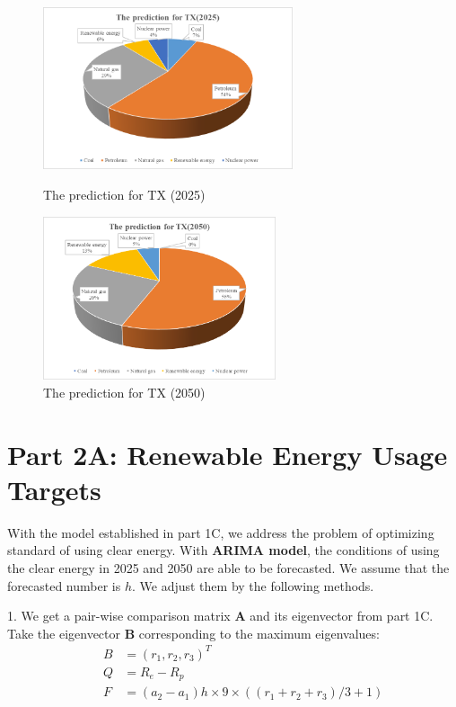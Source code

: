 \documentclass{mcmthesis}
\begin{document}
\begin{figure}
\begin{minipage}[t]{0.5\linewidth}
\centering
\includegraphics[width=2.9in]{./picturec/TXF2025.png}
\caption{The prediction for TX (2025)}
\label{fig:left:21}
\end{minipage}%
\begin{minipage}[t]{0.5\linewidth}
\centering
\includegraphics[width=2.7in]{./picturec/TXF2050.png}
\caption{The prediction for TX (2050)}
\label{fig:right:22}
\end{minipage}
\end{figure}     

\section{Part 2A: Renewable Energy Usage Targets}

With the model established in part 1C, we address the problem of optimizing standard of using clear energy. With {\bf{ARIMA model}}, the conditions of using the clear energy in 2025 and 2050 are able to be forecasted. We assume that the forecasted number is $h$. We adjust them by the following methods.

1. We get a pair-wise comparison matrix {\bf{A}} and its eigenvector from part 1C. Take the eigenvector {\bf{B}} corresponding to the maximum eigenvalues:
\begin{align}
&&B&=(r_1, r_2, r_3)^T \\
&&Q&=R_e-R_p \\
&&F&=(a_2-a_1)h\times 9\times \left((r_1+r_2+r_3)/3+1\right)
\end{align}
\end{document}
